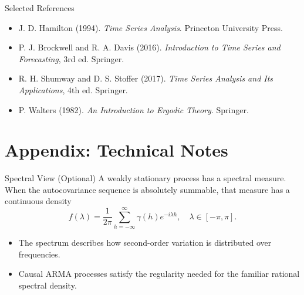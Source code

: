 \documentclass{beamer}
\begin{document}
\begin{frame}{Selected References}
  \small
  \begin{itemize}
    \item J. D. Hamilton (1994). \textit{Time Series Analysis}. Princeton University Press.
    \item P. J. Brockwell and R. A. Davis (2016). \textit{Introduction to Time Series and Forecasting}, 3rd ed. Springer.
    \item R. H. Shumway and D. S. Stoffer (2017). \textit{Time Series Analysis and Its Applications}, 4th ed. Springer.
    \item P. Walters (1982). \textit{An Introduction to Ergodic Theory}. Springer.
  \end{itemize}
\end{frame}

\contactslide

\appendix


\section{Appendix: Technical Notes}

\begin{frame}{Spectral View (Optional)}
  A weakly stationary process has a spectral measure. When the autocovariance sequence is absolutely summable, that measure has a continuous density
  \[
    f(\lambda) = \frac{1}{2\pi} \sum_{h=-\infty}^{\infty} \gamma(h) e^{-i \lambda h},
    \quad \lambda \in [-\pi, \pi].
  \]

  \vspace{0.3cm}
  \begin{itemize}
    \item The spectrum describes how second-order variation is distributed over frequencies.
    \item Causal ARMA processes satisfy the regularity needed for the familiar rational spectral density.
  \end{itemize}
\end{frame}
\end{document}
